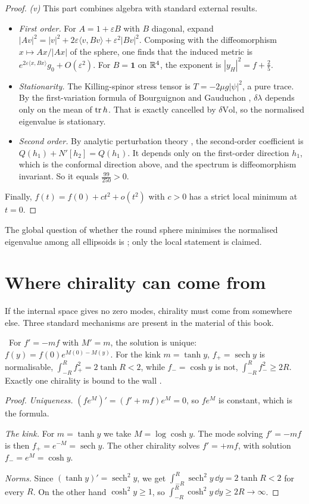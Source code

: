 \begin{proof}
\emph{(v)} This part combines algebra with standard external results.
\begin{itemize}
\item \emph{First order.} For $A=1+\varepsilon B$ with $B$ diagonal, expand $|Av|^2=|v|^2+2\varepsilon\langle v,Bv\rangle+\varepsilon^2|Bv|^2$. Composing with the diffeomorphism $x\mapsto Ax/|Ax|$ of the sphere, one finds that the induced metric is $e^{2\varepsilon\langle x,Bx\rangle}g_0+O(\varepsilon^2)$. For $B=\mathbf 1$ on $\mathbb{R}^4$, the exponent is $|y_H|^2=f+\frac25$.
\item \emph{Stationarity.} The Killing-spinor stress tensor is $T=-2\mu g|\psi|^2$, a pure trace. By the first-variation formula of Bourguignon and Gauduchon \ext, $\delta\lambda$ depends only on the mean of $\operatorname{tr} h$. That is exactly cancelled by $\delta\mathrm{Vol}$, so the normalised eigenvalue is stationary.
\item \emph{Second order.} By analytic perturbation theory \ext, the second-order coefficient is $Q(h_1)+N'[h_2]=Q(h_1)$. It depends only on the first-order direction $h_1$, which is the conformal direction above, and the spectrum is diffeomorphism invariant. So it equals $\frac{99}{250}>0$.
\end{itemize}
Finally, $f(t)=f(0)+ct^2+o(t^2)$ with $c>0$ has a strict local minimum at $t=0$.
\end{proof}


The global question of whether the round sphere minimises the normalised eigenvalue among all ellipsoids is \opn; only the local statement is claimed.

\section{Where chirality can come from}

If the internal space gives no zero modes, chirality must come from somewhere else. Three standard mechanisms are present in the material of this book.

\begin{proposition}\label{prop:jackiwrebbi}\ver\
For $f'=-mf$ with $M'=m$, the solution is unique: $f(y)=f(0)e^{M(0)-M(y)}$. For the kink $m=\tanh y$, $f_+=\operatorname{sech}y$ is normalisable, $\int_{-R}^R f_+^2=2\tanh R<2$, while $f_-=\cosh y$ is not, $\int_{-R}^Rf_-^2\ge2R$. Exactly one chirality is bound to the wall \cite{JackiwRebbi1976}.
\end{proposition}
\begin{proof}
\emph{Uniqueness.} $(fe^{M})'=(f'+mf)e^M=0$, so $fe^M$ is constant, which is the formula.

\emph{The kink.} For $m=\tanh y$ we take $M=\log\cosh y$. The mode solving $f'=-mf$ is then $f_+=e^{-M}=\operatorname{sech}y$. The other chirality solves $f'=+mf$, with solution $f_-=e^{M}=\cosh y$.

\emph{Norms.} Since $(\tanh y)'=\operatorname{sech}^2y$, we get $\int_{-R}^R\operatorname{sech}^2y\,\dd y=2\tanh R<2$ for every $R$. On the other hand $\cosh^2y\ge1$, so $\int_{-R}^R\cosh^2y\,\dd y\ge2R\to\infty$.
\end{proof}


